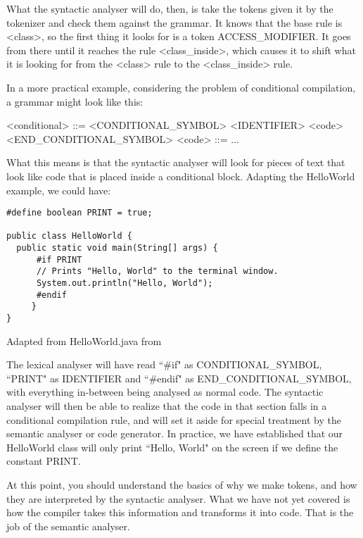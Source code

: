What the syntactic analyser will do, then, is take the tokens given it by the tokenizer and check them against the grammar. It knows that the base rule is <class>, so the first thing it looks for is a token ACCESS_MODIFIER. It goes from there until it reaches the rule <class_inside>, which causes it to shift what it is looking for from the <class> rule to the <class_inside> rule.

In a more practical example, considering the problem of conditional compilation, a grammar might look like this:

\begin{listing}
\begin{grammar}
<conditional> ::= <CONDITIONAL_SYMBOL> <IDENTIFIER> <code> <END_CONDITIONAL_SYMBOL>
\alt <code> ::= ...
\end{grammar}
\end{listing}

What this means is that the syntactic analyser will look for pieces of text that look like code that is placed inside a conditional block. Adapting the HelloWorld example, we could have:

\begin{listing}
\begin{verbatim}
#define boolean PRINT = true;

public class HelloWorld {
  public static void main(String[] args) {
      #if PRINT
      // Prints "Hello, World" to the terminal window.
      System.out.println("Hello, World");
      #endif
     }
}
\end{verbatim}
\caption{Adapted from HelloWorld.java from \cite{SEDGEWICK:2011}} \label{lst:helloworldjavaconditional}
\end{listing}

The lexical analyser will have read ``\#if" as CONDITIONAL_SYMBOL, ``PRINT" as IDENTIFIER and ``\#endif" as END_CONDITIONAL_SYMBOL, with everything in-between being analysed as normal code. The syntactic analyser will then be able to realize that the code in that section falls in a conditional compilation rule, and will set it aside for special treatment by the semantic analyser or code generator. In practice, we have established that our HelloWorld class will only print ``Hello, World" on the screen if we define the constant PRINT.

At this point, you should understand the basics of why we make tokens, and how they are interpreted by the syntactic analyser. What we have not yet covered is how the compiler takes this information and transforms it into code. That is the job of the semantic analyser.

